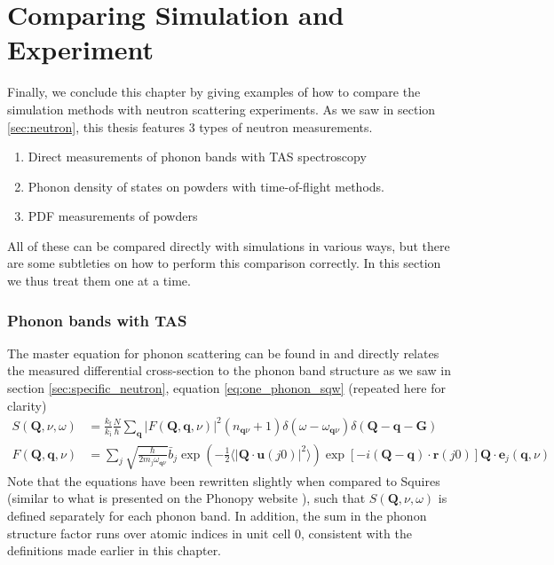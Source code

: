 \section{Comparing Simulation and Experiment}\label{sec:sim_experiment_compare}
Finally, we conclude this chapter by giving examples of how to compare the simulation methods with neutron scattering experiments. As we saw in section \ref{sec:neutron}, this thesis features 3 types of neutron measurements.

\begin{enumerate}
	\item Direct measurements of phonon bands with TAS spectroscopy
	\item Phonon density of states on powders with time-of-flight methods.
	\item PDF measurements of powders
\end{enumerate}

\noindent All of these can be compared directly with simulations in various ways, but there are some subtleties on how to perform this comparison correctly. In this section we thus treat them one at a time.

\subsubsection{Phonon bands with TAS}
The master equation for phonon scattering can be found in \cite{Squires2012} and directly relates the measured differential cross-section to the phonon band structure as we saw in section \ref{sec:specific_neutron}, equation \eqref{eq:one_phonon_sqw} (repeated here for clarity)
%
\begin{align}\label{eq:one_phonon_sqw_2}
	S(\bm{Q},\nu,\omega) &= \frac{k_\text{f}}{k_\text{i}} \frac{N}{\hbar} \sum_{\bm{q}} | F(\bm{Q},\bm{q},\nu) |^2 ( n_{\bm{q}\nu} + 1) \delta (\omega - \omega_{\bm{q}\nu}) \delta(\bm{Q} - \bm{q} - \bm{G}) \\ 
	F(\bm{Q}, \bm{q}, \nu) &= \sum_j \sqrt{\frac{\hbar}{2 m_j \omega_{\bm{q}\nu}}} \bar{b}_j \exp \left( -\frac{1}{2} \langle | \bm{Q} \cdot \bm{u}(j0) |^2 \rangle \right) \exp [ -i(\bm{Q} - \bm{q}) \cdot \bm{r}(j0) ] \bm{Q} \cdot \bm{e}_j(\bm{q},\nu) \label{eq:one_phonon_sqw_3}
\end{align}
%
Note that the equations have been rewritten slightly when compared to Squires \cite{Squires2012} (similar to what is presented on the Phonopy website \cite{phonopywebsite}), such that $S(\bm{Q},\nu,\omega)$ is defined separately for each phonon band. In addition, the sum in the phonon structure factor runs over atomic indices in unit cell 0, consistent with the definitions made earlier in this chapter.

